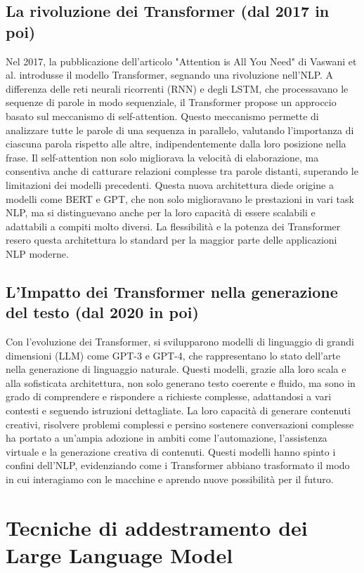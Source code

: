 \documentclass[target=mst,aauheader=,style=]{thud}
\begin{document}
\subsection{La rivoluzione dei Transformer (dal 2017 in poi)}
Nel 2017, la pubblicazione dell’articolo "Attention is All You Need" di Vaswani et al. introdusse il modello Transformer, segnando una rivoluzione nell’NLP. A differenza delle reti neurali ricorrenti (RNN) e degli LSTM, che processavano le sequenze di parole in modo sequenziale, il Transformer propose un approccio basato sul meccanismo di self-attention. Questo meccanismo permette di analizzare tutte le parole di una sequenza in parallelo, valutando l’importanza di ciascuna parola rispetto alle altre, indipendentemente dalla loro posizione nella frase. Il self-attention non solo migliorava la velocità di elaborazione, ma consentiva anche di catturare relazioni complesse tra parole distanti, superando le limitazioni dei modelli precedenti. Questa nuova architettura diede origine a modelli come BERT e GPT, che non solo miglioravano le prestazioni in vari task NLP, ma si distinguevano anche per la loro capacità di essere scalabili e adattabili a compiti molto diversi. La flessibilità e la potenza dei Transformer resero questa architettura lo standard per la maggior parte delle applicazioni NLP moderne.

\subsection{L’Impatto dei Transformer nella generazione del testo (dal 2020 in poi)}
Con l’evoluzione dei Transformer, si svilupparono modelli di linguaggio di grandi dimensioni (LLM) come GPT-3 e GPT-4, che rappresentano lo stato dell’arte nella generazione di linguaggio naturale. Questi modelli, grazie alla loro scala e alla sofisticata architettura, non solo generano testo coerente e fluido, ma sono in grado di comprendere e rispondere a richieste complesse, adattandosi a vari contesti e seguendo istruzioni dettagliate. La loro capacità di generare contenuti creativi, risolvere problemi complessi e persino sostenere conversazioni complesse ha portato a un’ampia adozione in ambiti come l’automazione, l’assistenza virtuale e la generazione creativa di contenuti. Questi modelli hanno spinto i confini dell’NLP, evidenziando come i Transformer abbiano trasformato il modo in cui interagiamo con le macchine e aprendo nuove possibilità per il futuro.

\section{Tecniche di addestramento dei Large Language Model}
\end{document}
